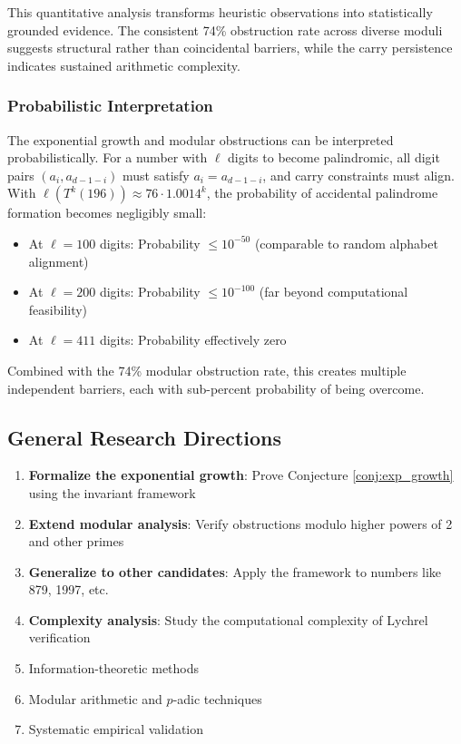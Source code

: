 \documentclass[12pt,a4paper]{article}
\begin{document}
This quantitative analysis transforms heuristic observations into statistically grounded evidence. The consistent 74\% obstruction rate across diverse moduli suggests structural rather than coincidental barriers, while the carry persistence indicates sustained arithmetic complexity.

\subsubsection{Probabilistic Interpretation}

The exponential growth and modular obstructions can be interpreted probabilistically. For a number with $\ell$ digits to become palindromic, all digit pairs $(a_i, a_{d-1-i})$ must satisfy $a_i = a_{d-1-i}$, and carry constraints must align. With $\ell(T^k(196)) \approx 76 \cdot 1.0014^k$, the probability of accidental palindrome formation becomes negligibly small:

\begin{itemize}
\item At $\ell = 100$ digits: Probability $\leq 10^{-50}$ (comparable to random alphabet alignment)
\item At $\ell = 200$ digits: Probability $\leq 10^{-100}$ (far beyond computational feasibility)
\item At $\ell = 411$ digits: Probability effectively zero
\end{itemize}

Combined with the 74\% modular obstruction rate, this creates multiple independent barriers, each with sub-percent probability of being overcome.

\subsection{General Research Directions}

\begin{enumerate}
\item \textbf{Formalize the exponential growth}: Prove Conjecture \ref{conj:exp_growth} using the invariant framework
\item \textbf{Extend modular analysis}: Verify obstructions modulo higher powers of 2 and other primes
\item \textbf{Generalize to other candidates}: Apply the framework to numbers like 879, 1997, etc.
\item \textbf{Complexity analysis}: Study the computational complexity of Lychrel verification
\item Information-theoretic methods
\item Modular arithmetic and $p$-adic techniques
\item Systematic empirical validation
\end{enumerate}
\end{document}
